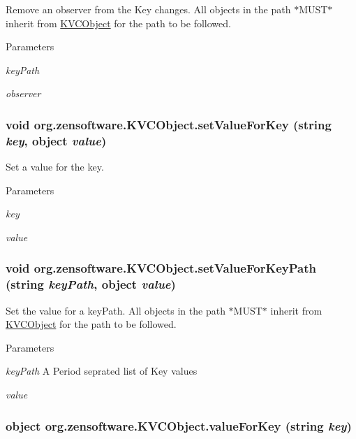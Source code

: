 Remove an observer from the Key changes. All objects in the path $\ast$MUST$\ast$ inherit from \hyperlink{classorg_1_1zensoftware_1_1_k_v_c_object}{KVCObject} for the path to be followed. 
\begin{DoxyParams}{Parameters}
\item[{\em keyPath}]\item[{\em observer}]\end{DoxyParams}
\hypertarget{classorg_1_1zensoftware_1_1_k_v_c_object_a98df6d75d84c6f1bde8e628971ac0ee6}{
\subsubsection[{setValueForKey}]{\setlength{\rightskip}{0pt plus 5cm}void org.zensoftware.KVCObject.setValueForKey (string {\em key}, \/  object {\em value})}}
\label{classorg_1_1zensoftware_1_1_k_v_c_object_a98df6d75d84c6f1bde8e628971ac0ee6}


Set a value for the key. 
\begin{DoxyParams}{Parameters}
\item[{\em key}]\item[{\em value}]\end{DoxyParams}
\hypertarget{classorg_1_1zensoftware_1_1_k_v_c_object_a73079f0d9176bd7660117b5bd90627dd}{
\subsubsection[{setValueForKeyPath}]{\setlength{\rightskip}{0pt plus 5cm}void org.zensoftware.KVCObject.setValueForKeyPath (string {\em keyPath}, \/  object {\em value})}}
\label{classorg_1_1zensoftware_1_1_k_v_c_object_a73079f0d9176bd7660117b5bd90627dd}


Set the value for a keyPath. All objects in the path $\ast$MUST$\ast$ inherit from \hyperlink{classorg_1_1zensoftware_1_1_k_v_c_object}{KVCObject} for the path to be followed. 
\begin{DoxyParams}{Parameters}
\item[{\em keyPath}]A Period seprated list of Key values\item[{\em value}]\end{DoxyParams}
\hypertarget{classorg_1_1zensoftware_1_1_k_v_c_object_a5a91cba1a0416b75d8db302c61911213}{
\subsubsection[{valueForKey}]{\setlength{\rightskip}{0pt plus 5cm}object org.zensoftware.KVCObject.valueForKey (string {\em key})}}
\label{classorg_1_1zensoftware_1_1_k_v_c_object_a5a91cba1a0416b75d8db302c61911213}


